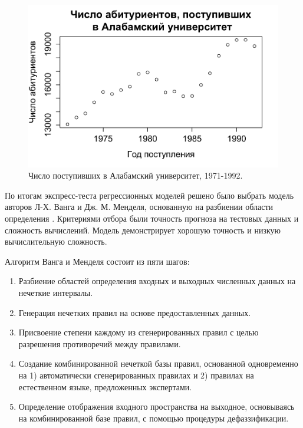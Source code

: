 \documentclass[a4paper,14pt]{article}
\begin{document}
\begin{figure}[bhtp]
	\begin{center}			
		\includegraphics{images/UA_enrollments.pdf}
		\caption{Число поступивших в Алабамский университет, 1971-1992.}		
		\label{figure:UA_enrollments}
	\end{center}
\end{figure}

По итогам экспресс-теста регрессионных моделей решено было выбрать модель авторов Л-Х. Ванга и Дж. М. Менделя, основанную на разбиении области определения \cite{Wang1992}. Критериями отбора были точность прогноза на тестовых данных и сложность вычислений. Модель демонстрирует хорошую точность и низкую вычислительную сложность. 

Алгоритм Ванга и Менделя состоит из пяти шагов:
\begin{enumerate}
	\item Разбиение областей определения входных и выходных численных данных на нечеткие интервалы.
	\item Генерация нечетких правил на основе предоставленных данных.
	\item Присвоение степени каждому из сгенерированных правил с целью разрешения противоречий между правилами.
	\item Создание комбинированной нечеткой базы правил, основанной одновременно на 1) автоматически сгенерированных правилах и
	   2) правилах на естественном языке, предложенных экспертами.
	
	\item Определение отображения входного пространства на выходное, основываясь на комбинированной базе правил, с помощью процедуры дефаззификации.
\end{enumerate}
\end{document}
